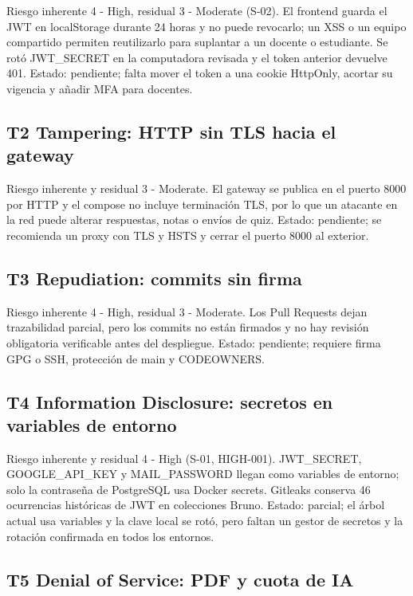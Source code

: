 \documentclass[12pt,a4paper]{article}
\begin{document}
Riesgo inherente 4 - High, residual 3 - Moderate (S-02). El frontend guarda el JWT en localStorage durante 24 horas y no puede revocarlo; un XSS o un equipo compartido permiten reutilizarlo para suplantar a un docente o estudiante. Se rotó JWT\_SECRET en la computadora revisada y el token anterior devuelve 401. Estado: pendiente; falta mover el token a una cookie HttpOnly, acortar su vigencia y añadir MFA para docentes.\par
{}\subsection*{T2 Tampering: HTTP sin TLS hacia el gateway}
Riesgo inherente y residual 3 - Moderate. El gateway se publica en el puerto 8000 por HTTP y el compose no incluye terminación TLS, por lo que un atacante en la red puede alterar respuestas, notas o envíos de quiz. Estado: pendiente; se recomienda un proxy con TLS y HSTS y cerrar el puerto 8000 al exterior.\par
{}\subsection*{T3 Repudiation: commits sin firma}
Riesgo inherente 4 - High, residual 3 - Moderate. Los Pull Requests dejan trazabilidad parcial, pero los commits no están firmados y no hay revisión obligatoria verificable antes del despliegue. Estado: pendiente; requiere firma GPG o SSH, protección de main y CODEOWNERS.\par
{}\subsection*{T4 Information Disclosure: secretos en variables de entorno}
Riesgo inherente y residual 4 - High (S-01, HIGH-001). JWT\_SECRET, GOOGLE\_API\_KEY y MAIL\_PASSWORD llegan como variables de entorno; solo la contraseña de PostgreSQL usa Docker secrets. Gitleaks conserva 46 ocurrencias históricas de JWT en colecciones Bruno. Estado: parcial; el árbol actual usa variables y la clave local se rotó, pero faltan un gestor de secretos y la rotación confirmada en todos los entornos.\par
{}\subsection*{T5 Denial of Service: PDF y cuota de IA}
\end{document}
